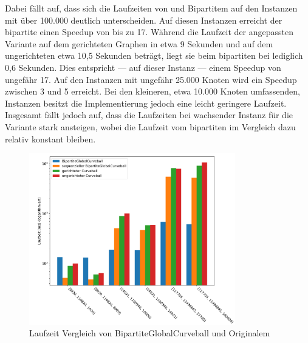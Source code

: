 Dabei fällt auf, dass sich die Laufzeiten von \cb{} und Bipartitem \gc{} auf den
Instanzen mit über 100.000 deutlich unterscheiden. Auf diesen Instanzen erreicht
der bipartite \gc{} einen Speedup von bis zu 17. 
Während die Laufzeit der angepassten \cb{} Variante auf dem gerichteten Graphen in etwa 9 Sekunden
und auf dem ungerichteten etwa 10,5 Sekunden beträgt, liegt sie beim bipartiten \gc{} bei lediglich 
0,6 Sekunden. Dies entspricht --- auf dieser Instanz ---  einem Speedup von ungefähr 17.
Auf den Instanzen mit ungefähr 25.000 Knoten wird ein Speedup zwischen 3 und 5 erreicht.
Bei den kleineren, etwa 10.000 Knoten umfassenden,  Instanzen besitzt die \cb{} Implementierung jedoch 
eine leicht geringere Laufzeit.
\\

Insgesamt fällt jedoch auf, dass die Laufzeiten bei wachsender Instanz für die \cb{}
Variante stark ansteigen, wobei die Laufzeit vom bipartiten \gc{} im Vergleich dazu
relativ konstant bleiben.
\begin{figure}
\centering
	\includegraphics[width = 0.8\textwidth]{figures/speedup.pdf}
	\caption{Laufzeit Vergleich von BipartiteGlobalCurveball und Originalem \cb{}}
	\label{fig:speedup_komplett}
\end{figure}

